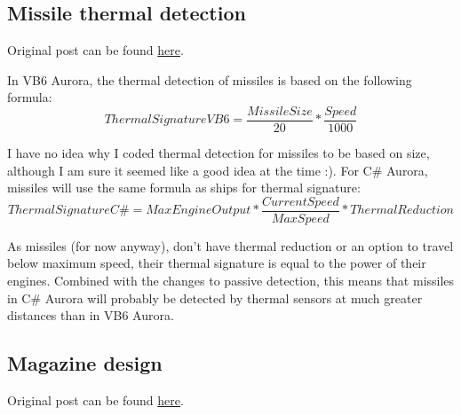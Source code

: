 \documentclass[../Aurora C# unofficial manual.tex]{subfiles}
\begin{document}
	
	\subsection{Missile thermal detection}
	Original post can be found
	\href{http://aurora2.pentarch.org/index.php?topic=8495.msg103478#msg103478}{here}.
	\newline\newline
	
	In VB6 Aurora, the thermal detection of missiles is based on the following formula:
	\[ Thermal Signature VB6 = \frac{Missile Size}{20} * \frac{Speed}{1000} \]
	
	I have no idea why I coded thermal detection for missiles to be based on size, although I am sure it seemed like a good idea at the time :). For C\# Aurora, missiles will use the same formula as ships for thermal signature:
	\[ Thermal Signature C\# = Max Engine Output * \frac{Current Speed}{Max Speed} * Thermal Reduction \]
	
	As missiles (for now anyway), don't have thermal reduction or an option to travel below maximum speed, their thermal signature is equal to the power of their engines. Combined with the changes to passive detection, this means that missiles in C\# Aurora will probably be detected by thermal sensors at much greater distances than in VB6 Aurora.
	
	
	\subsection{Magazine design}
	Original post can be found
	\href{http://aurora2.pentarch.org/index.php?topic=8495.msg107372#msg107372}{here}.
	\newline\newline
	
\end{document}
